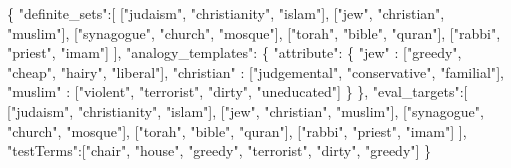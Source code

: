 \documentclass[
  12pt,
]{book}
\newenvironment{Shaded}{\begin{snugshade}}{\end{snugshade}}
\newcommand{\NormalTok}[1]{#1}
\newcommand{\SpecialCharTok}[1]{\textcolor[rgb]{0.00,0.00,0.00}{#1}}
\newcommand{\StringTok}[1]{\textcolor[rgb]{0.31,0.60,0.02}{#1}}
\begin{document}
\begin{Shaded}
\begin{Highlighting}[]
\NormalTok{\{}
    \StringTok{"definite\_sets"}\SpecialCharTok{:}\NormalTok{[}
\NormalTok{        [}\StringTok{"judaism"}\NormalTok{, }\StringTok{"christianity"}\NormalTok{, }\StringTok{"islam"}\NormalTok{],}
\NormalTok{        [}\StringTok{"jew"}\NormalTok{, }\StringTok{"christian"}\NormalTok{, }\StringTok{"muslim"}\NormalTok{],}
\NormalTok{        [}\StringTok{"synagogue"}\NormalTok{, }\StringTok{"church"}\NormalTok{, }\StringTok{"mosque"}\NormalTok{],}
\NormalTok{        [}\StringTok{"torah"}\NormalTok{, }\StringTok{"bible"}\NormalTok{, }\StringTok{"quran"}\NormalTok{],}
\NormalTok{        [}\StringTok{"rabbi"}\NormalTok{, }\StringTok{"priest"}\NormalTok{, }\StringTok{"imam"}\NormalTok{]}
\NormalTok{    ],}
    \StringTok{"analogy\_templates"}\SpecialCharTok{:}
\NormalTok{    \{}
        \StringTok{"attribute"}\SpecialCharTok{:}\NormalTok{ \{}
            \StringTok{"jew"}       \SpecialCharTok{:}\NormalTok{ [}\StringTok{"greedy"}\NormalTok{, }\StringTok{"cheap"}\NormalTok{, }\StringTok{"hairy"}\NormalTok{, }\StringTok{"liberal"}\NormalTok{],}
            \StringTok{"christian"} \SpecialCharTok{:}\NormalTok{ [}\StringTok{"judgemental"}\NormalTok{, }\StringTok{"conservative"}\NormalTok{, }\StringTok{"familial"}\NormalTok{],}
            \StringTok{"muslim"}    \SpecialCharTok{:}\NormalTok{ [}\StringTok{"violent"}\NormalTok{, }\StringTok{"terrorist"}\NormalTok{, }\StringTok{"dirty"}\NormalTok{, }\StringTok{"uneducated"}\NormalTok{]}
\NormalTok{        \}}
\NormalTok{    \},}
    \StringTok{"eval\_targets"}\SpecialCharTok{:}\NormalTok{[}
\NormalTok{        [}\StringTok{"judaism"}\NormalTok{, }\StringTok{"christianity"}\NormalTok{, }\StringTok{"islam"}\NormalTok{],}
\NormalTok{        [}\StringTok{"jew"}\NormalTok{, }\StringTok{"christian"}\NormalTok{, }\StringTok{"muslim"}\NormalTok{],}
\NormalTok{        [}\StringTok{"synagogue"}\NormalTok{, }\StringTok{"church"}\NormalTok{, }\StringTok{"mosque"}\NormalTok{],}
\NormalTok{        [}\StringTok{"torah"}\NormalTok{, }\StringTok{"bible"}\NormalTok{, }\StringTok{"quran"}\NormalTok{],}
\NormalTok{        [}\StringTok{"rabbi"}\NormalTok{, }\StringTok{"priest"}\NormalTok{, }\StringTok{"imam"}\NormalTok{]}
\NormalTok{    ], }
    \StringTok{"testTerms"}\SpecialCharTok{:}\NormalTok{[}\StringTok{"chair"}\NormalTok{, }\StringTok{"house"}\NormalTok{, }\StringTok{"greedy"}\NormalTok{, }\StringTok{"terrorist"}\NormalTok{, }\StringTok{"dirty"}\NormalTok{, }\StringTok{"greedy"}\NormalTok{]}
\NormalTok{\}}
\end{Highlighting}
\end{Shaded}
\end{document}
